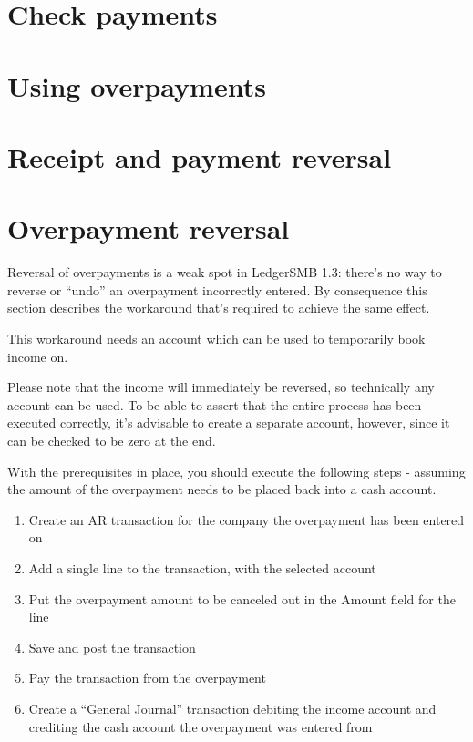 \section{Check payments}


\section{Using overpayments}
\label{sec:UsingOverpayments}

\section{Receipt and payment reversal}


\section{Overpayment reversal}

Reversal of overpayments is a weak spot in LedgerSMB 1.3: there's no way
to reverse or ``undo'' an overpayment incorrectly entered.  By consequence
this section describes the workaround that's required to achieve the same
effect.

This workaround needs an account which can be used to temporarily book income on.

Please note that the income will immediately be reversed, so
technically any account can be used.  To be able to assert that the entire process
has been executed correctly, it's advisable to create a separate account, however, since
it can be checked to be zero at the end.

With the prerequisites in place, you should execute the following steps - assuming the amount
of the overpayment needs to be placed back into a cash account.

\begin{enumerate}
\item \label{itm:StartSetupOverpaymentCancelation} Create an AR transaction for the
    company the overpayment has been entered on
\item Add a single line to the transaction, with the selected account
\item Put the overpayment amount to be canceled out in the Amount field for the line
\item \label{itm:EndSetupOverpaymentCancelation} Save and post the transaction
\item \label{itm:OverpaymentCancelation} Pay the transaction from the overpayment
\item \label{itm:MoveToCashAccount} Create a ``General Journal'' transaction debiting the income account and crediting the
    cash account the overpayment was entered from
\end{enumerate}

